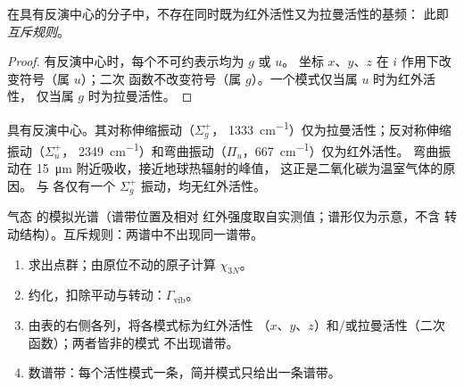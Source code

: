 \begin{proposition}[互斥规则]\label{prop:b3:group-theory-applied:mutual-exclusion}
在具有反演中心的分子中，不存在同时既为红外活性又为拉曼活性的基频：
此即\emph{互斥规则}。
\end{proposition}

\begin{proof}
有反演中心时，每个不可约表示均为 $g$ 或 $u$。
坐标 $x$、$y$、$z$ 在 $i$ 作用下改变符号（属 $u$）；二次
函数不改变符号（属 $g$）。一个模式仅当属 $u$ 时为红外活性，
仅当属 $g$ 时为拉曼活性。
\end{proof}

\begin{example}[二氧化碳与温室效应]\label{ex:b3:group-theory-applied:co2}
 具有反演中心。其对称伸缩振动（$\Sigma_g^+$，
\qty{1333}{cm^{-1}}）仅为拉曼活性；反对称伸缩振动（$\Sigma_u^+$，
\qty{2349}{cm^{-1}}）和弯曲振动（$\Pi_u$，\qty{667}{cm^{-1}}）仅为红外活性。
弯曲振动在 \qty{15}{\micro m} 附近吸收，接近地球热辐射的峰值，
这正是二氧化碳为温室气体的原因。 与
 各仅有一个 $\Sigma_g^+$ 振动，均无红外活性。
\end{example}

\begin{omfigure}

{\small 气态  的模拟光谱（谱带位置及相对
红外强度取自实测值；谱形仅为示意，不含
转动结构）。互斥规则：两谱中不出现同一谱带。}
\end{omfigure}

\begin{method}[预测振动光谱]\label{met:b3:group-theory-applied:vibrations}
\begin{enumerate}
  \item 求出点群；由原位不动的原子计算 $\chi_{3N}$。
  \item 约化，扣除平动与转动：$\Gamma_{\mathrm{vib}}$。
  \item 由表的右侧各列，将各模式标为红外活性
        （$x$、$y$、$z$）和/或拉曼活性（二次函数）；两者皆非的模式
        不出现谱带。
  \item 数谱带：每个活性模式一条，简并模式只给出一条谱带。
\end{enumerate}
\end{method}

